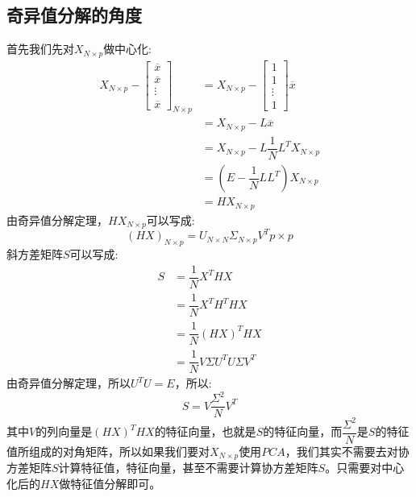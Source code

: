 \documentclass[withoutpreface,bwprint]{cumcmthesis} %
\begin{document}
	\subsection{\Large 奇异值分解的角度}
	首先我们先对$X_{N\times p}$做中心化:
	\begin{align*}
		X_{N\times p}-\left[
			\begin{array}{c}
				\overline{x}\\
				\overline{x}\\
				\vdots\\
				\overline{x}
			\end{array}
		\right]_{N \times p}
		& =X_{N \times p}-\left[
			\begin{array}{c}
				1\\
				1\\
				\vdots\\
				1
			\end{array}
		\right]\overline{x}\\
		&=X_{N \times p}-L\overline{x} \\
		&=X_{N \times p}-L\dfrac{1}{N}L^TX_{N \times p}\\
		&=\left( E-\dfrac{1}{N}LL^T\right)X_{N\times p} \\
		&=HX_{N\times p}		
	\end{align*}
	由奇异值分解定理，$HX_{N \times p}$可以写成:
	\begin{equation}
		\left(HX\right)_{N\times p}=U_{N\times N} \Sigma_{N\times p} V^T{p \times p}
	\end{equation}
	斜方差矩阵$S$可以写成:
	\begin{align*}
		S & =\dfrac{1}{N}X^THX \\
		  &=\dfrac{1}{N} X^T H^T H X \\
		  &=\dfrac{1}{N} (HX)^T HX \\
		  &=\dfrac{1}{N}  V \Sigma U^T U \Sigma V^T 
	\end{align*}
	由奇异值分解定理，所以$U^TU=E$，所以:
	\begin{equation}
		S=V \dfrac{\Sigma^2}{N}  V^T
	\end{equation}
	其中$V$的列向量是$(HX)^THX$的特征向量，也就是$S$的特征向量，而$\dfrac{\Sigma^2}{N}$是$S$的特征值所组成的对角矩阵，所以如果我们要对$X_{N\times p}$使用$PCA$，我们其实不需要去对协方差矩阵$S$计算特征值，特征向量，甚至不需要计算协方差矩阵$S$。只需要对中心化后的$HX$做特征值分解即可。
	
\end{document}
